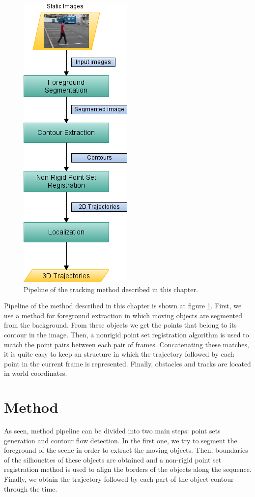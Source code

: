 \begin{figure}[h!]
  \centering
  \includegraphics[width=\textwidth,height=\textwidth]{pipeline}
  \caption{Pipeline of the tracking method described in this chapter.}\label{fig:cp02_pipeline}
\end{figure}

Pipeline of the method described in this chapter is shown at figure \ref{fig:cp02_pipeline}. First, we use a method for foreground extraction in which moving objects are segmented from the background. From these objects we get the points that belong to its contour in the image. Then, a nonrigid point set registration algorithm is used to match the point pairs between each pair of frames. Concatenating these matches, it is quite easy to keep an structure in which the trajectory followed by each point in the current frame is represented. Finally, obstacles and tracks are located in world coordinates.

\section{Method}\label{ch:chapter02_01}

As seen, method pipeline can be divided into two main steps: point sets generation and contour flow detection. In the first one, we try to segment the foreground of the scene in order to extract the moving objects. Then, boundaries of the silhouettes of these objects are obtained and a non-rigid point set registration method is used to align the borders of the objects along the sequence. Finally, we obtain the trajectory followed by each part of the object contour through the time.

